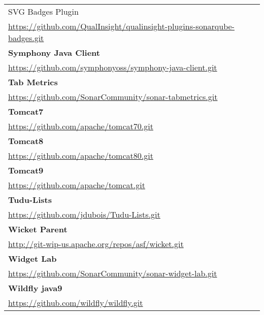 \begin{table}[]
\begin{tabular}{|p{130mm}|}
SVG Badges Plugin                                  \\ \url{https://github.com/QualInsight/qualinsight-plugins-sonarqube-badges.git}      \\ \hline \bf
Symphony Java Client                               \\ \url{https://github.com/symphonyoss/symphony-java-client.git}                      \\ \hline \bf 
Tab Metrics                                        \\ \url{https://github.com/SonarCommunity/sonar-tabmetrics.git}                       \\ \hline \bf
Tomcat7                                            \\ \url{https://github.com/apache/tomcat70.git}                                       \\ \hline \bf
Tomcat8                                            \\ \url{https://github.com/apache/tomcat80.git}                                       \\ \hline \bf
Tomcat9                                            \\ \url{https://github.com/apache/tomcat.git}                                         \\ \hline \bf
Tudu-Lists                                         \\ \url{https://github.com/jdubois/Tudu-Lists.git}                                    \\ \hline \bf
Wicket Parent                                      \\ \url{http://git-wip-us.apache.org/repos/asf/wicket.git}                            \\ \hline \bf
Widget Lab                                         \\ \url{https://github.com/SonarCommunity/sonar-widget-lab.git}                       \\ \hline \bf
Wildfly java9                                     \\ \url{https://github.com/wildfly/wildfly.git}                                       \\ \hline

\end{tabular}
\end{table}